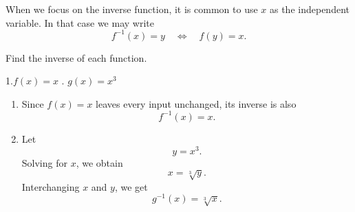 \begin{remark}
When we focus on the inverse function, it is common to use \(x\) as the independent variable. In that case we may write
\[
f^{-1}(x)=y
\quad \Longleftrightarrow \quad
f(y)=x.
\]
\end{remark}

\begin{example}
Find the inverse of each function. 

1.\(f(x)=x\) . \(g(x)=x^3\)

\end{example}

\begin{solution}
\leavevmode
\begin{enumerate}
    \item  Since \(f(x)=x\) leaves every input unchanged, its inverse is also
    \[
    f^{-1}(x)=x.
    \]

    \item Let
    \[
    y=x^3.
    \]
    Solving for \(x\), we obtain
    \[
    x=\sqrt[3]{y}.
    \]
    Interchanging \(x\) and \(y\), we get
    \[
    g^{-1}(x)=\sqrt[3]{x}.
    \]
\end{enumerate}
\end{solution}

